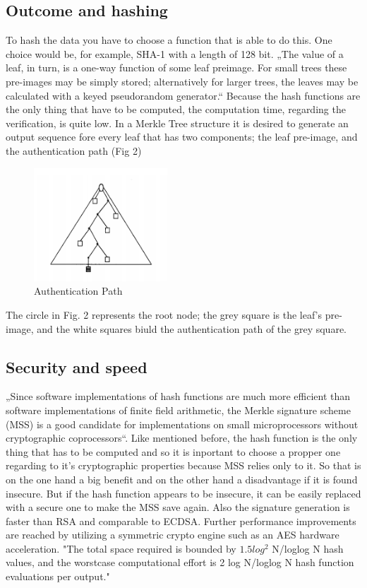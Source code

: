\subsection{Outcome and hashing}
To hash the data you have to choose a function that is able to do this. One choice would be, for example, SHA-1 with a length of 128 bit.
„The value of a leaf, in turn, is a one-way function of some leaf preimage. For small trees these pre-images may be simply stored; alternatively for larger trees, the leaves may be calculated with a keyed pseudorandom generator.“ \cite{MT} Because the hash functions are the only thing that have to be computed, the computation time, regarding the verification, is quite low. \cite{METR} In a Merkle Tree structure it is desired to generate an output sequence fore every leaf that has two components; the leaf pre-image, and the authentication path (Fig 2) \cite{MT}

\begin{figure}
\centering
\includegraphics[width=5cm]{Pages/Merkle/API.png}
\caption{Authentication Path}
\end{figure}

The circle in Fig. 2 represents the root node; the grey square is the leaf’s pre-image, and the white squares biuld the authentication path of the grey square.

\subsection{Security and speed}
„Since software implementations of hash functions are much more efficient than software implementations of finite field arithmetic, the Merkle signature scheme (MSS) is a good candidate for implementations on small microprocessors without cryptographic coprocessors“. \cite{FHB} Like mentioned before, the hash function is the only thing that has to be computed and so it is inportant to choose a propper one regarding to it’s cryptographic properties because MSS relies only to it. So that is on the one hand a big benefit and on the other hand a disadvantage if it is found insecure. But if the hash function appears to be insecure, it can be easily replaced with a secure one to make the MSS save again. Also the signature generation is faster than RSA and comparable to ECDSA. Further performance improvements are reached by utilizing a symmetric crypto engine such as an AES hardware acceleration. \cite{FHB}  "The total space
required is bounded by $ 1.5 log^2 $  N/loglog N hash values, and the worstcase computational effort is 2 log N/loglog N hash function evaluations
per output." \cite{MT}
